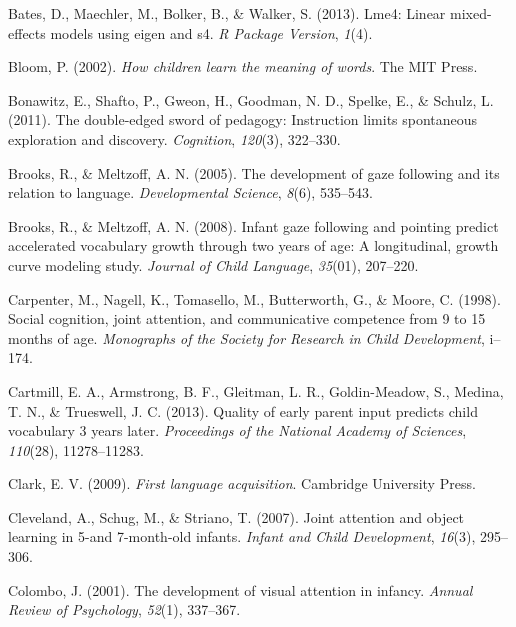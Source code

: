 \documentclass[authoryear, review]{elsarticle}
\providecommand{\DIFaddbegin}{} %
\providecommand{\DIFaddend}{} %
\begin{document}
\DIFaddbegin \hypertarget{ref-bates2013lme4}{}
\DIFaddend Bates, D., Maechler, M., Bolker, B., \& Walker, S. (2013). Lme4: Linear
mixed-effects models using eigen and s4. \emph{R Package Version},
\emph{1}(4).

\DIFaddbegin \hypertarget{ref-bloom2002children}{}
\DIFaddend Bloom, P. (2002). \emph{How children learn the meaning of words}. The
MIT Press.

\DIFaddbegin \hypertarget{ref-bonawitz2011double}{}
\DIFaddend Bonawitz, E., Shafto, P., Gweon, H., Goodman, N. D., Spelke, E., \&
Schulz, L. (2011). The double-edged sword of pedagogy: Instruction
limits spontaneous exploration and discovery. \emph{Cognition},
\emph{120}(3), 322--330.

\DIFaddbegin \hypertarget{ref-brooks2005development}{}
\DIFaddend Brooks, R., \& Meltzoff, A. N. (2005). The development of gaze following
and its relation to language. \emph{Developmental Science}, \emph{8}(6),
535--543.

\DIFaddbegin \hypertarget{ref-brooks2008infant}{}
\DIFaddend Brooks, R., \& Meltzoff, A. N. (2008). Infant gaze following and
pointing predict accelerated vocabulary growth through two years of age:
A longitudinal, growth curve modeling study. \emph{Journal of Child
Language}, \emph{35}(01), 207--220.

\DIFaddbegin \hypertarget{ref-carpenter1998social}{}
\DIFaddend Carpenter, M., Nagell, K., Tomasello, M., Butterworth, G., \& Moore, C.
(1998). Social cognition, joint attention, and communicative competence
from 9 to 15 months of age. \emph{Monographs of the Society for Research
in Child Development}, i--174.

\DIFaddbegin \hypertarget{ref-cartmill2013quality}{}
\DIFaddend Cartmill, E. A., Armstrong, B. F., Gleitman, L. R., Goldin-Meadow, S.,
Medina, T. N., \& Trueswell, J. C. (2013). Quality of early parent input
predicts child vocabulary 3 years later. \emph{Proceedings of the
National Academy of Sciences}, \emph{110}(28), 11278--11283.

\DIFaddbegin \hypertarget{ref-clark2009first}{}
\DIFaddend Clark, E. V. (2009). \emph{First language acquisition}. Cambridge
University Press.

\DIFaddbegin \hypertarget{ref-cleveland2007joint}{}
\DIFaddend Cleveland, A., Schug, M., \& Striano, T. (2007). Joint attention and
object learning in 5-and 7-month-old infants. \emph{Infant and Child
Development}, \emph{16}(3), 295--306.

\DIFaddbegin \hypertarget{ref-colombo2001development}{}
\DIFaddend Colombo, J. (2001). The development of visual attention in infancy.
\emph{Annual Review of Psychology}, \emph{52}(1), 337--367.
\end{document}
